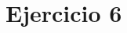 \documentclass[../../e3_tp2_main.tex]{subfiles}
\begin{document}
\chapter{Ejercicio 6}
\end{document}
